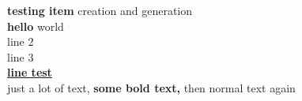 \documentclass[10pt]{article}
\begin{document}
\textbullet \textbf{testing item} creation and generation\\ 
\textbullet \textbf{hello} world\\ 
\textbullet line 2\\ 
line 3\\ 
\underline{\textbf{line test}}\\ 
\textbullet just a lot of text, \textbf{some bold text,} then normal text again\\ 
\end{document}
